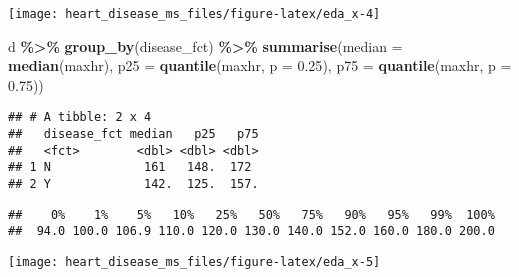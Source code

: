\documentclass[
]{article}
\newenvironment{Shaded}{\begin{snugshade}}{\end{snugshade}}
\newcommand{\AttributeTok}[1]{\textcolor[rgb]{0.13,0.29,0.53}{#1}}
\newcommand{\CommentTok}[1]{\textcolor[rgb]{0.56,0.35,0.01}{\textit{#1}}}
\newcommand{\FloatTok}[1]{\textcolor[rgb]{0.00,0.00,0.81}{#1}}
\newcommand{\FunctionTok}[1]{\textcolor[rgb]{0.13,0.29,0.53}{\textbf{#1}}}
\newcommand{\NormalTok}[1]{#1}
\newcommand{\SpecialCharTok}[1]{\textcolor[rgb]{0.81,0.36,0.00}{\textbf{#1}}}
\begin{document}
\begin{center}\texttt{[image: heart\_disease\_ms\_files/figure-latex/eda\_x-4]} \end{center}

\begin{Shaded}
\begin{Highlighting}[]
\NormalTok{d }\SpecialCharTok{\%\textgreater{}\%}
  \FunctionTok{group\_by}\NormalTok{(disease\_fct) }\SpecialCharTok{\%\textgreater{}\%}
  \FunctionTok{summarise}\NormalTok{(}\AttributeTok{median =} \FunctionTok{median}\NormalTok{(maxhr),}
            \AttributeTok{p25 =} \FunctionTok{quantile}\NormalTok{(maxhr, }\AttributeTok{p =} \FloatTok{0.25}\NormalTok{),}
            \AttributeTok{p75 =} \FunctionTok{quantile}\NormalTok{(maxhr, }\AttributeTok{p =} \FloatTok{0.75}\NormalTok{)) }
\end{Highlighting}
\end{Shaded}

\begin{verbatim}
## # A tibble: 2 x 4
##   disease_fct median   p25   p75
##   <fct>        <dbl> <dbl> <dbl>
## 1 N             161   148.  172 
## 2 Y             142.  125.  157.
\end{verbatim}

\begin{Shaded}
\end{Shaded}

\begin{verbatim}
##    0%    1%    5%   10%   25%   50%   75%   90%   95%   99%  100% 
##  94.0 100.0 106.9 110.0 120.0 130.0 140.0 152.0 160.0 180.0 200.0
\end{verbatim}

\begin{Shaded}
\end{Shaded}

\begin{center}\texttt{[image: heart\_disease\_ms\_files/figure-latex/eda\_x-5]} \end{center}
\end{document}
